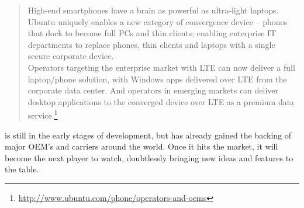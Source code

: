 \begin{quotation}
High-end smartphones have a brain as powerful as ultra-light laptops. Ubuntu uniquely enables a new category of convergence device – phones that dock to become full PCs and thin clients; enabling enterprise IT departments to replace phones, thin clients and laptops with a single secure corporate device.\\

Operators targeting the enterprise market with LTE can now deliver a full laptop/phone solution, with Windows apps delivered over LTE from the corporate data center. And operators in emerging markets can deliver desktop applications to the converged device over LTE as a premium data service.\footnote{\url{http://www.ubuntu.com/phone/operators-and-oems}}
\end{quotation}


 is still in the early stages of development, but has already gained the backing of major OEM's and carriers around the world. Once it hits the market, it will become the next player to watch, doubtlessly bringing new ideas and features to the table.  
















 